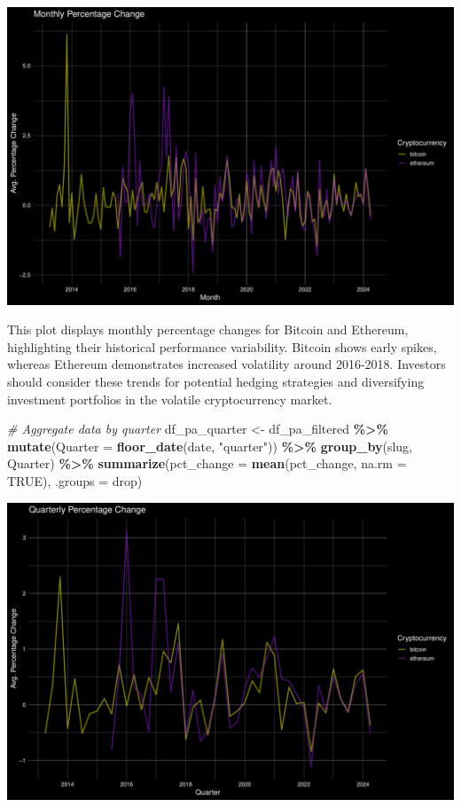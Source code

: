 \documentclass[
]{article}
\newenvironment{Shaded}{\begin{snugshade}}{\end{snugshade}}
\newcommand{\AttributeTok}[1]{\textcolor[rgb]{0.13,0.29,0.53}{#1}}
\newcommand{\CommentTok}[1]{\textcolor[rgb]{0.56,0.35,0.01}{\textit{#1}}}
\newcommand{\ConstantTok}[1]{\textcolor[rgb]{0.56,0.35,0.01}{#1}}
\newcommand{\FunctionTok}[1]{\textcolor[rgb]{0.13,0.29,0.53}{\textbf{#1}}}
\newcommand{\NormalTok}[1]{#1}
\newcommand{\OtherTok}[1]{\textcolor[rgb]{0.56,0.35,0.01}{#1}}
\newcommand{\SpecialCharTok}[1]{\textcolor[rgb]{0.81,0.36,0.00}{\textbf{#1}}}
\newcommand{\StringTok}[1]{\textcolor[rgb]{0.31,0.60,0.02}{#1}}
\begin{document}
\includegraphics{Crypto_ETL_files/figure-latex/Plot mom qoq 35156153-1.pdf}

This plot displays monthly percentage changes for Bitcoin and Ethereum,
highlighting their historical performance variability. Bitcoin shows
early spikes, whereas Ethereum demonstrates increased volatility around
2016-2018. Investors should consider these trends for potential hedging
strategies and diversifying investment portfolios in the volatile
cryptocurrency market.

\begin{Shaded}
\begin{Highlighting}[]
\CommentTok{\# Aggregate data by quarter}
\NormalTok{df\_pa\_quarter }\OtherTok{\textless{}{-}}\NormalTok{ df\_pa\_filtered }\SpecialCharTok{\%\textgreater{}\%}
  \FunctionTok{mutate}\NormalTok{(}\AttributeTok{Quarter =} \FunctionTok{floor\_date}\NormalTok{(date, }\StringTok{"quarter"}\NormalTok{)) }\SpecialCharTok{\%\textgreater{}\%}
  \FunctionTok{group\_by}\NormalTok{(slug, Quarter) }\SpecialCharTok{\%\textgreater{}\%}
  \FunctionTok{summarize}\NormalTok{(}\AttributeTok{pct\_change =} \FunctionTok{mean}\NormalTok{(pct\_change, }\AttributeTok{na.rm =} \ConstantTok{TRUE}\NormalTok{), }\AttributeTok{.groups =} \StringTok{\textquotesingle{}drop\textquotesingle{}}\NormalTok{)}
\end{Highlighting}
\end{Shaded}

\includegraphics{Crypto_ETL_files/figure-latex/Plot mom qoq-1.pdf}
\end{document}
